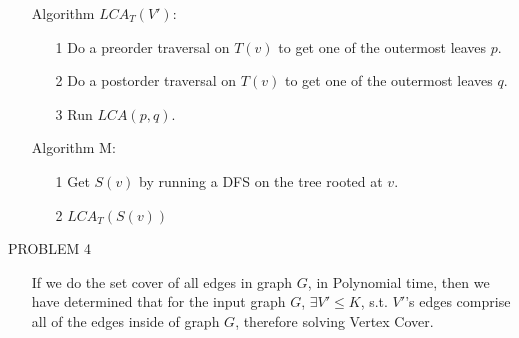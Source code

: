 \documentclass[a4paper]{article}
\begin{document}
\begin{enumerate}
\item[] Algorithm $LCA_T(V')$:\\
\begin{enumerate}

\item[1] Do a preorder traversal on $T(v)$ to get one of the outermost leaves $p$.
\item[2] Do a postorder traversal on $T(v)$ to get one of the outermost leaves $q$.
\item[3] Run $LCA(p,q)$.

\end{enumerate}

\item[] Algorithm M:\\
\begin{enumerate}

\item[1] Get $S(v)$ by running a DFS on the tree rooted at $v$.
\item[2] $LCA_T(S(v))$

\end{enumerate}
\end{enumerate}
\bigskip
\bigskip

\noindent PROBLEM 4

\begin{enumerate}

\item[] If we do the set cover of all edges in graph $G$, in Polynomial time, then we have determined that for the input graph $G$, $\exists V' \leq K$, s.t. $V'$'s edges comprise all of the edges inside of graph $G$, therefore solving Vertex Cover.

\end{enumerate}
\end{document}

